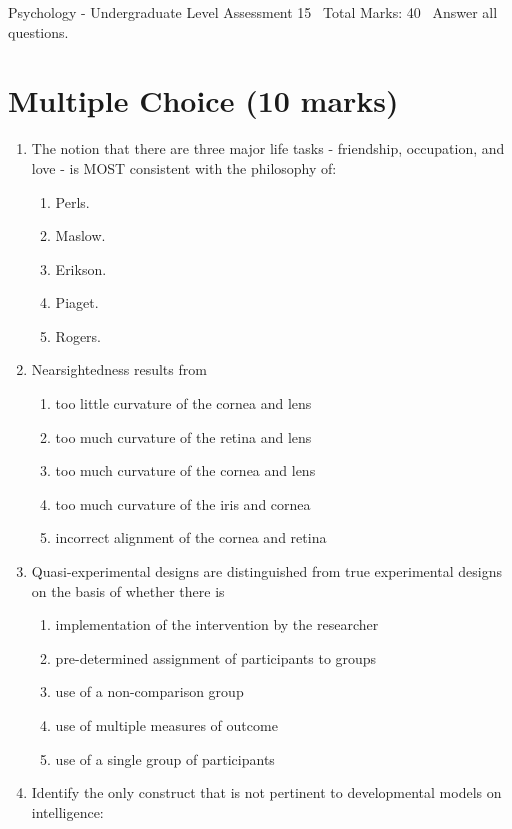 \documentclass[12pt]{article}
\begin{document}
\begin{center}
Psychology - Undergraduate Level Assessment 15 \
Total Marks: 40 \
Answer all questions.
\end{center}

\section*{Multiple Choice (10 marks)}
\begin{enumerate}[label=\arabic*.]
\item The notion that there are three major life tasks - friendship, occupation, and love - is MOST consistent with the philosophy of:
\begin{enumerate}[label=(\alph*)]
    \item Perls.
    \item Maslow.
    \item Erikson.
    \item Piaget.
    \item Rogers.
\end{enumerate}
\item Nearsightedness results from
\begin{enumerate}[label=(\alph*)]
    \item too little curvature of the cornea and lens
    \item too much curvature of the retina and lens
    \item too much curvature of the cornea and lens
    \item too much curvature of the iris and cornea
    \item incorrect alignment of the cornea and retina
\end{enumerate}
\item Quasi-experimental designs are distinguished from true experimental designs on the basis of whether there is
\begin{enumerate}[label=(\alph*)]
    \item implementation of the intervention by the researcher
    \item pre-determined assignment of participants to groups
    \item use of a non-comparison group
    \item use of multiple measures of outcome
    \item use of a single group of participants
\end{enumerate}
\item Identify the only construct that is not pertinent to developmental models on intelligence:

\end{enumerate}
\end{document}
